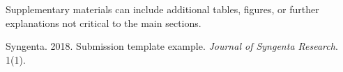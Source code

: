 \documentclass[syngen,nonblindrev]{informs3-syngen}
\begin{document}
Supplementary materials can include additional tables, figures, or further explanations not
critical to the main sections.










\begin{thebibliography}{}

Syngenta. 2018. Submission template example. \textit{Journal of Syngenta Research}. 1(1).
\end{thebibliography}

\end{document}
